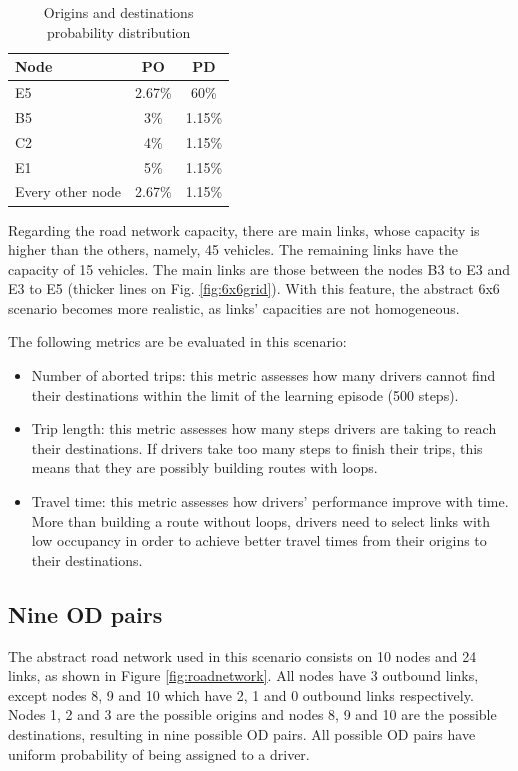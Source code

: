 \documentclass{RITA}
\begin{document}
{%
\begin{table}[ht]
\begin{center}
\begin{tabular}{|l|c|c|} \hline
Node & PO & PD \\ \hline
E5 & 2.67\% & 60\% \\ \hline
B5 & 3\% & 1.15\% \\ \hline
C2 & 4\% & 1.15\% \\ \hline
E1 & 5\% & 1.15\% \\ \hline
Every other node & 2.67\% & 1.15\% \\ \hline
\end{tabular}
\caption{Origins and destinations probability distribution}\label{tab:odprob}
\end{center}
\end{table}
}%
Regarding the road network capacity, there are main links, whose capacity is higher than the others, namely, 45 vehicles. The remaining links have the capacity of 15 vehicles. The main links are those between the nodes B3 to E3 and E3 to E5 (thicker lines on Fig. \ref{fig:6x6grid}). With this feature, the abstract 6x6 scenario becomes more realistic, as links' capacities are not homogeneous.

The following metrics are be evaluated in this scenario:

\begin{itemize}
  \item Number of aborted trips: this metric assesses how many drivers cannot find their destinations within the limit of the learning episode (500 steps).
  \item Trip length: this metric assesses how many steps drivers are taking to reach their destinations. If drivers take too many steps to finish their trips, this means that they are possibly building routes with loops.
 \item Travel time: this metric assesses how drivers' performance improve with time. More than building a route without loops, drivers need to select links with low occupancy in order to achieve better travel times from their origins to their destinations.
\end{itemize}

\subsection{Nine OD pairs}
\label{sec:nineODDescription}
The abstract road network used in this scenario consists on 10 nodes and 24 links, as shown in Figure \ref{fig:roadnetwork}. All nodes have 3 outbound links, except nodes 8, 9 and 10 which have 2, 1 and 0 outbound links respectively. Nodes 1, 2 and 3 are the possible origins and nodes 8, 9 and 10 are the possible destinations, resulting in nine possible OD pairs. All possible OD pairs have uniform probability of being assigned to a driver. %
\end{document}

